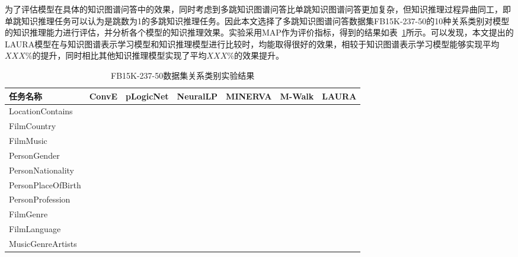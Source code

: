 \documentclass[algorithmlist, AutoFakeBold, AutoFakeSlant, figurelist, tablelist, nomlist, masters]{seuthesix}
\begin{document}
为了评估模型在具体的知识图谱问答中的效果，同时考虑到多跳知识图谱问答比单跳知识图谱问答更加复杂，但知识推理过程异曲同工，即单跳知识推理任务可以认为是跳数为1的多跳知识推理任务。因此本文选择了多跳知识图谱问答数据集FB15K-237-50的10种关系类别对模型的知识推理能力进行评估，并分析各个模型的知识推理效果。实验采用MAP作为评价指标，得到的结果如表~\ref{Experiment2_tasks}所示。可以发现，本文提出的LAURA模型在与知识图谱表示学习模型和知识推理模型进行比较时，均能取得很好的效果，相较于知识图谱表示学习模型能够实现平均$XXX\%$的提升，同时相比其他知识推理模型实现了平均$XXX\%$的效果提升。
\begin{table}[]
  \centering
  \begin{tabular*}{1\textwidth}{@{\extracolsep{\fill}}lcccccc}
  \toprule[1pt]
  任务名称 & ConvE & pLogicNet & NeuralLP & MINERVA & M-Walk & LAURA \\ \hline
  LocationContains &  &  &  &  &  &  \\
  FilmCountry &  &  &  &  &  &  \\
  FilmMusic &  &  &  &  &  &  \\
  PersonGender &  &  &  &  &  &  \\
  PersonNationality &  &  &  &  &  &  \\
  PersonPlaceOfBirth &  &  &  &  &  &  \\
  PersonProfession &  &  &  &  &  &  \\
  FilmGenre &  &  &  &  &  &  \\
  FilmLanguage &  &  &  &  &  &  \\
  MusicGenreArtists &  &  &  &  &  &  \\
  \bottomrule[1pt]
  \end{tabular*}
  \caption{FB15K-237-50数据集关系类别实验结果}
  \label{Experiment2_tasks}
\end{table}
\end{document}
